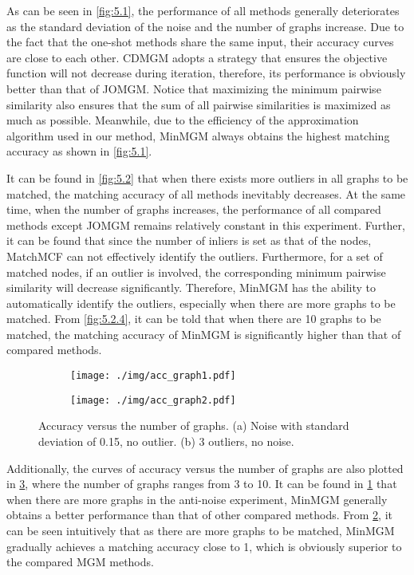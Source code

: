 As can be seen in \cref{fig:5.1}, the performance of all methods generally deteriorates as the standard deviation of the noise and the number of graphs increase. Due to the fact that the one-shot methods share the same input, their accuracy curves are close to each other. CDMGM adopts a strategy that ensures the objective function will not decrease during iteration, therefore, its performance is obviously better than that of JOMGM. Notice that maximizing the minimum pairwise similarity also ensures that the sum of all pairwise similarities is maximized as much as possible. Meanwhile, due to the efficiency of the approximation algorithm used in our method, MinMGM always obtains the highest matching accuracy as shown in \cref{fig:5.1}.

It can be found in \cref{fig:5.2} that when there exists more outliers in all graphs to be matched, the matching accuracy of all methods inevitably decreases. At the same time, when the number of graphs increases, the performance of all compared methods except JOMGM remains relatively constant in this experiment. Further, it can be found that since the number of inliers is set as that of the nodes, MatchMCF can not effectively identify the outliers. Furthermore, for a set of matched nodes, if an outlier is involved, the corresponding minimum pairwise similarity will decrease significantly. Therefore, MinMGM has the ability to automatically identify the outliers, especially when there are more graphs to be matched. From \cref{fig:5.2.4}, it can be told that when there are 10 graphs to be matched, the matching accuracy of MinMGM is significantly higher than that of compared methods.

\begin{figure}[htb!]
    \centering
    \begin{subfigure}{.23\textwidth}
        \centering
        \texttt{[image: ./img/acc\_graph1.pdf]}
        \caption{}
        \label{fig:5.3.1}
    \end{subfigure}
    \begin{subfigure}{.23\textwidth}
        \centering
        \texttt{[image: ./img/acc\_graph2.pdf]}
        \caption{}
        \label{fig:5.3.2}
    \end{subfigure}
    \caption{Accuracy versus the number of graphs. (a) Noise with standard deviation of 0.15, no outlier. (b) 3 outliers, no noise.}
    \label{fig:5.3}
\end{figure}

Additionally, the curves of accuracy versus the number of graphs are also plotted in \cref{fig:5.3}, where the number of graphs ranges from 3 to 10. It can be found in \cref{fig:5.3.1} that when there are more graphs in the anti-noise experiment, MinMGM generally obtains a better performance than that of other compared methods. From \cref{fig:5.3.2}, it can be seen intuitively that as there are more graphs to be matched, MinMGM gradually achieves a matching accuracy close to 1, which is obviously superior to the compared MGM methods.

